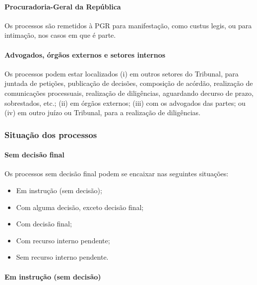 \documentclass[
]{book}
\providecommand{\tightlist}{%
  \setlength{\itemsep}{0pt}\setlength{\parskip}{0pt}}
\begin{document}
\hypertarget{procuradoria-geral-da-repuxfablica}{%
\paragraph{Procuradoria-Geral da República}\label{procuradoria-geral-da-repuxfablica}}

Os processos são remetidos à PGR para manifestação, como custus legis, ou para intimação, nos casos em que é parte.

\hypertarget{advogados-uxf3rguxe3os-externos-e-setores-internos}{%
\paragraph{Advogados, órgãos externos e setores internos}\label{advogados-uxf3rguxe3os-externos-e-setores-internos}}

Os processos podem estar localizados (i) em outros setores do Tribunal, para juntada de petições, publicação de decisões, composição de acórdão, realização de comunicações processuais, realização de diligências, aguardando decurso de prazo, sobrestados, etc.; (ii) em órgãos externos; (iii) com os advogados das partes; ou (iv) em outro juízo ou Tribunal, para a realização de diligências.

\hypertarget{situauxe7uxe3o-dos-processos}{%
\subsubsection{Situação dos processos}\label{situauxe7uxe3o-dos-processos}}

\hypertarget{sem-decisuxe3o-final}{%
\paragraph{Sem decisão final}\label{sem-decisuxe3o-final}}

Os processos sem decisão final podem se encaixar nas seguintes situações:

\begin{itemize}
\tightlist
\item
  Em instrução (sem decisão);
\item
  Com alguma decisão, exceto decisão final;
\item
  Com decisão final;
\item
  Com recurso interno pendente;
\item
  Sem recurso interno pendente.
\end{itemize}

\hypertarget{em-instruuxe7uxe3o-sem-decisuxe3o}{%
\paragraph{Em instrução (sem decisão)}\label{em-instruuxe7uxe3o-sem-decisuxe3o}}
\end{document}
